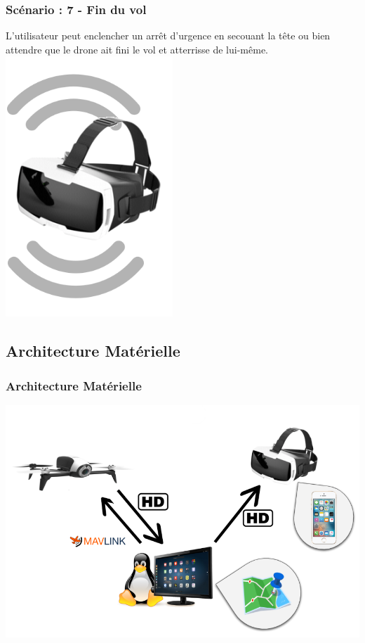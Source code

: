 \documentclass{beamer}
\begin{document}


	\begin{frame}
		\begin{center}
		\frametitle{Scénario : 7 - Fin du vol}
        L'utilisateur peut enclencher un arrêt d'urgence en secouant la tête ou bien attendre que le drone ait fini le vol et atterrisse de lui-même.\\
        \includegraphics[scale=0.4]{shake.png}
		\end{center}
	\end{frame}
	


	\begin{frame}
		\section{Architecture Matérielle}
		\begin{center}
		\frametitle{Architecture Matérielle}

       
        \includegraphics[scale=0.6]{archi_materielle.png}
		\end{center}
	\end{frame}
	
\end{document}
